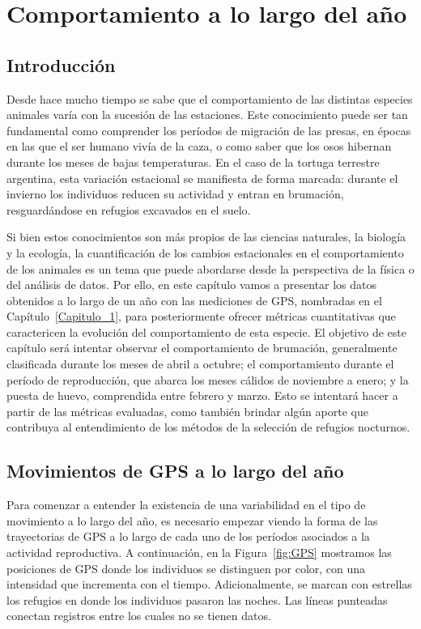 \chapter{Comportamiento a lo largo del año}\label{Capitulo_3}
\chapterquote{}{}
\section{Introducción}\label{III:introduccion}

Desde hace mucho tiempo se sabe que el comportamiento de las distintas especies animales varía con la sucesión de las estaciones. 
Este conocimiento puede ser tan fundamental como comprender los períodos de migración de las presas, en épocas en las que el ser humano vivía 
de la caza, o como saber que los osos hibernan durante los meses de bajas temperaturas. En el caso de la tortuga terrestre argentina, 
esta variación estacional se manifiesta de forma marcada: durante el invierno los individuos reducen su actividad y entran en brumación, 
resguardándose en refugios excavados en el suelo.

Si bien estos conocimientos son más propios de las ciencias naturales, la biología y la ecología, la cuantificación de los cambios estacionales
en el comportamiento de los animales es un tema que puede abordarse desde la perspectiva de la física o del análisis de datos. Por ello, en este
capítulo vamos a presentar los datos obtenidos a lo largo de un año con las mediciones de GPS, nombradas en el Capítulo~\ref{Capitulo_1}, 
para posteriormente ofrecer métricas cuantitativas que caractericen la evolución del comportamiento de esta especie. El objetivo de este capítulo 
será intentar observar el comportamiento de brumación, generalmente clasificada durante los meses de abril a octubre; el comportamiento 
durante el período de reproducción, que abarca los meses cálidos de noviembre a enero; y la puesta de huevo, comprendida entre febrero y marzo.
Esto se intentará hacer a partir de las métricas evaluadas, como también brindar algún aporte que contribuya al entendimiento de los métodos de 
la selección de refugios nocturnos.

\section{Movimientos de GPS a lo largo del año}

Para comenzar a entender la existencia de una variabilidad en el tipo de movimiento a lo largo del año, es necesario empezar viendo la forma
de las trayectorias de GPS a lo largo de cada uno de los períodos asociados a la actividad reproductiva. A continuación, en la Figura~\ref{fig:GPS}
mostramos las posiciones de GPS donde los individuos se distinguen por color, con una intensidad que incrementa con el tiempo. Adicionalmente, 
se marcan con estrellas los refugios en donde los individuos pasaron las noches. Las líneas punteadas conectan registros entre los cuales no 
se tienen datos.


